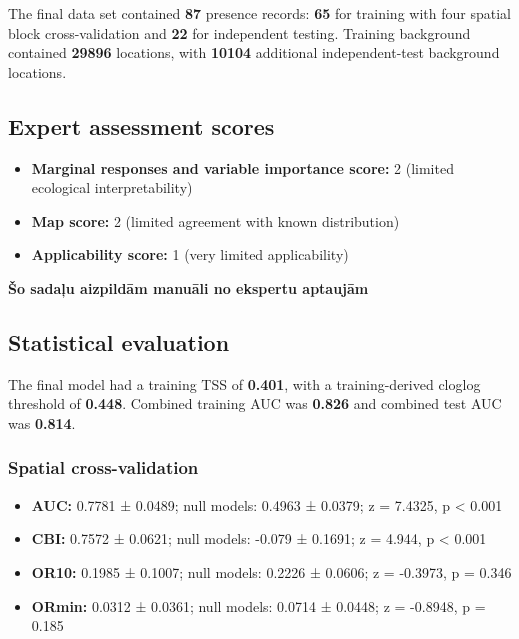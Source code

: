 \documentclass[
  openany]{book}
\providecommand{\tightlist}{%
  \setlength{\itemsep}{0pt}\setlength{\parskip}{0pt}}
\providecommand{\tightlist}{%
  \setlength{\itemsep}{0pt}%
  \setlength{\parskip}{0pt}%
}
\begin{document}
The final data set contained \textbf{87} presence records: \textbf{65} for training with four spatial block cross-validation and \textbf{22} for independent testing. Training background contained \textbf{29896} locations, with \textbf{10104} additional independent-test background locations.

\subsection*{Expert assessment scores}\label{expert-assessment-scores-4}

\begin{itemize}
\tightlist
\item
  \textbf{Marginal responses and variable importance score:} 2 (limited ecological interpretability)
\item
  \textbf{Map score:} 2 (limited agreement with known distribution)
\item
  \textbf{Applicability score:} 1 (very limited applicability)
\end{itemize}

\textbf{Šo sadaļu aizpildām manuāli no ekspertu aptaujām}

\subsection*{Statistical evaluation}\label{statistical-evaluation-4}

The final model had a training TSS of \textbf{0.401}, with a training-derived cloglog threshold of \textbf{0.448}. Combined training AUC was \textbf{0.826} and combined test AUC was \textbf{0.814}.

\subsubsection*{Spatial cross-validation}\label{spatial-cross-validation-4}

\begin{itemize}
\tightlist
\item
  \textbf{AUC:} 0.7781 ± 0.0489; null models: 0.4963 ± 0.0379; z = 7.4325, p \textless{} 0.001
\item
  \textbf{CBI:} 0.7572 ± 0.0621; null models: -0.079 ± 0.1691; z = 4.944, p \textless{} 0.001
\item
  \textbf{OR10:} 0.1985 ± 0.1007; null models: 0.2226 ± 0.0606; z = -0.3973, p = 0.346
\item
  \textbf{ORmin:} 0.0312 ± 0.0361; null models: 0.0714 ± 0.0448; z = -0.8948, p = 0.185
\end{itemize}
\end{document}
